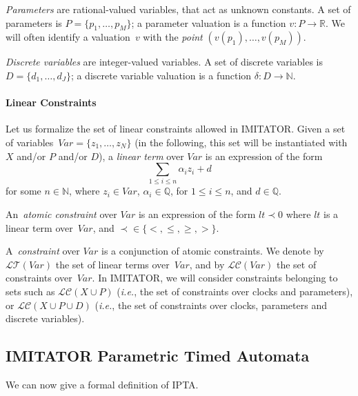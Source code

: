 \documentclass[a4paper,11pt]{report}
\makeatletter
\newcommand{\Clock}{X} %
\newcommand{\dval}{\ensuremath{\delta}} %
\newcommand{\DVar}{D} %
\newcommand{\dvar}{d} %
\newcommand{\DVarCard}{J} %
\newcommand{\LConstraint}{\mathcal{LC}} %
\newcommand{\LConstraintXP}{\LConstraint(\Clock \cup \Param)}
\newcommand{\LConstraintXPD}{\LConstraint(\Clock \cup \Param \cup \DVar)}
\newcommand{\lterm}{\mathit{lt}}
\newcommand{\LTerm}{\mathcal{LT}} %
\newcommand{\Param}{P} %
\newcommand{\param}{p} %
\newcommand{\ParamCard}{M} %
\newcommand{\pval}{v} %
\newcommand{\Var}{\mathit{Var}} %
\newcommand{\var}{\mathit{z}} %
\newcommand{\VarCard}{N} %
\newcommand{\grandn}{{\mathbb N}}
\newcommand{\grandq}{{\mathbb Q}}
\newcommand{\grandr}{{\mathbb R}}
\newcommand{\imitator}{\textsf{IMITATOR}}
\newcommand{\IPTA}{IPTA}
\newcommand{\ie}{\textcolor{colorok}{\textit{i.e.},\@}}
\makeatother
\begin{document}
\emph{Parameters} are rational-valued variables, that act as unknown constants.
A set of parameters is $\Param = \{ \param_1, \dots, \param_\ParamCard \} $;
a parameter valuation is a function $\pval\colon \Param \rightarrow \grandr$.
We will often identify a valuation~$\pval$ with the \emph{point} $(\pval(\param_1), \dots, \pval(\param_{\ParamCard}))$.

\emph{Discrete variables} are integer-valued variables.
A set of discrete variables is $\DVar = \{ \dvar_1, \dots, \dvar_\DVarCard \} $;
a discrete variable valuation is a function $\dval \colon \DVar \rightarrow \grandn$.


\paragraph{Linear Constraints}
Let us formalize the set of linear constraints allowed in \imitator{}.
Given a set of variables~$\Var = \{ \var_1, \dots, \var_\VarCard \}$ (in the following, this set will be instantiated with $\Clock$ and/or $\Param$ and/or $\DVar$), a \emph{linear term} over $\Var$ is an expression of the form
$$
\sum_{1 \leq i \leq n} \alpha_i \var_i + d
$$
for some $n \in \grandn$,
	where
	$\var_{i} \in \Var$,
	$\alpha_{i} \in \grandq$, for $1 \leq i \leq n$,
	and
	$d \in \grandq$.

An~\emph{atomic constraint} over $\Var$ is an expression of the form
$
\lterm \prec 0
$
	where
	$\lterm$ is a linear term over~$\Var$,
	and
	$\prec \in \{<, \leq, \geq, >\}$.

A~\emph{constraint} over $\Var$ is a conjunction of atomic constraints.
We denote by $\LTerm(\Var)$ the set of linear terms over~$\Var$, and by $\LConstraint(\Var)$ the set of constraints over~$\Var$.
In \imitator{}, we will consider constraints belonging to sets such as $\LConstraintXP$ (\ie{} the set of constraints over clocks and parameters), or $\LConstraintXPD$ (\ie{} the set of constraints over clocks, parameters and discrete variables).


\subsection{\imitator{} Parametric Timed Automata}


We can now give a formal definition of \IPTA{}.
\end{document}
